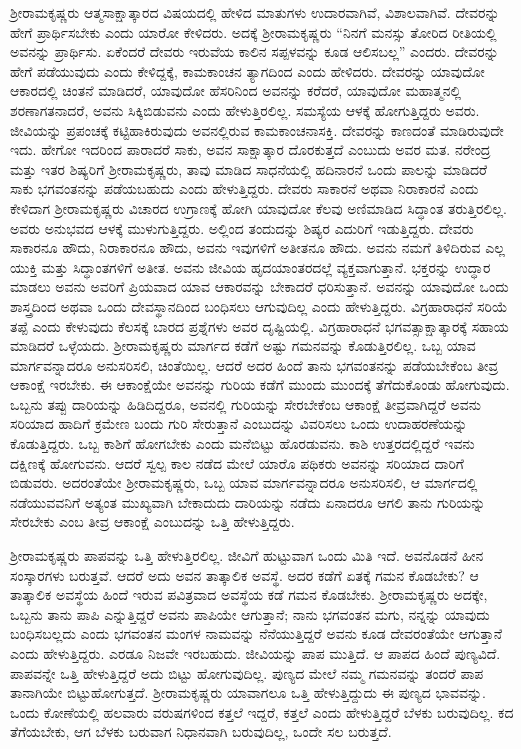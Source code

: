 ಶ‍್ರೀರಾಮಕೃಷ್ಣರು ಆತ್ಮಸಾಕ್ಷಾತ್ಕಾರದ ವಿಷಯದಲ್ಲಿ ಹೇಳಿದ ಮಾತುಗಳು ಉದಾರವಾಗಿವೆ, ವಿಶಾಲವಾಗಿವೆ. ದೇವರನ್ನು ಹೇಗೆ ಪ್ರಾರ್ಥಿಸಬೇಕು ಎಂದು ಯಾರೋ ಕೇಳಿದರು. ಅದಕ್ಕೆ ಶ‍್ರೀರಾಮಕೃಷ್ಣರು “ನಿನಗೆ ಮನಸ್ಸು ತೋರಿದ ರೀತಿಯಲ್ಲಿ ಅವನನ್ನು ಪ್ರಾರ್ಥಿಸು. ಏಕೆಂದರೆ ದೇವರು ಇರುವೆಯ ಕಾಲಿನ ಸಪ್ಪಳವನ್ನು ಕೂಡ ಆಲಿಸಬಲ್ಲ” ಎಂದರು. ದೇವರನ್ನು ಹೇಗೆ ಪಡೆಯುವುದು ಎಂದು ಕೇಳಿದ್ದಕ್ಕೆ, ಕಾಮಕಾಂಚನ ತ್ಯಾಗದಿಂದ ಎಂದು ಹೇಳಿದರು. ದೇವರನ್ನು ಯಾವುದೋ ಆಕಾರದಲ್ಲಿ ಚಿಂತನೆ ಮಾಡಿದರೆ, ಯಾವುದೋ ಹೆಸರಿನಿಂದ ಅವನನ್ನು ಕರೆದರೆ, ಯಾವುದೋ ಮಹಾತ್ಮನಲ್ಲಿ ಶರಣಾಗತನಾದರೆ, ಅವನು ಸಿಕ್ಕಿಬಿಡುವನು ಎಂದು ಹೇಳುತ್ತಿರಲಿಲ್ಲ. ಸಮಸ್ಯೆಯ ಆಳಕ್ಕೆ ಹೋಗುತ್ತಿದ್ದರು ಅವರು. ಜೀವಿಯನ್ನು ಪ್ರಪಂಚಕ್ಕೆ ಕಟ್ಟಿಹಾಕಿರುವುದು ಅವನಲ್ಲಿರುವ ಕಾಮಕಾಂಚನಾಸಕ್ತಿ. ದೇವರನ್ನು ಕಾಣದಂತೆ ಮಾಡಿರುವುದೇ ಇದು. ಹೇಗೋ ಇದರಿಂದ ಪಾರಾದರೆ ಸಾಕು, ಅವನ ಸಾಕ್ಷಾತ್ಕಾರ ದೊರಕುತ್ತದೆ ಎಂಬುದು ಅವರ ಮತ. ನರೇಂದ್ರ ಮತ್ತು ಇತರ ಶಿಷ್ಯರಿಗೆ ಶ‍್ರೀರಾಮಕೃಷ್ಣರು, ತಾವು ಮಾಡಿದ ಸಾಧನೆಯಲ್ಲಿ ಹದಿನಾರನೆ ಒಂದು ಪಾಲನ್ನು ಮಾಡಿದರೆ ಸಾಕು ಭಗವಂತನನ್ನು ಪಡೆಯಬಹುದು ಎಂದು ಹೇಳುತ್ತಿದ್ದರು. ದೇವರು ಸಾಕಾರನೆ ಅಥವಾ ನಿರಾಕಾರನೆ ಎಂದು ಕೇಳಿದಾಗ ಶ‍್ರೀರಾಮಕೃಷ್ಣರು ವಿಚಾರದ ಉಗ್ರಾಣಕ್ಕೆ ಹೋಗಿ ಯಾವುದೋ ಕೆಲವು ಅಣಿಮಾಡಿದ ಸಿದ್ಧಾಂತ ತರುತ್ತಿರಲಿಲ್ಲ. ಅವರು ಅನುಭವದ ಆಳಕ್ಕೆ ಮುಳುಗುತ್ತಿದ್ದರು. ಅಲ್ಲಿಂದ ತಂದುದನ್ನು ಶಿಷ್ಯರ ಎದುರಿಗೆ ಇಡುತ್ತಿದ್ದರು. ದೇವರು ಸಾಕಾರನೂ ಹೌದು, ನಿರಾಕಾರನೂ ಹೌದು, ಅವನು ಇವುಗಳಿಗೆ ಅತೀತನೂ ಹೌದು. ಅವನು ನಮಗೆ ತಿಳಿದಿರುವ ಎಲ್ಲ ಯುಕ್ತಿ ಮತ್ತು ಸಿದ್ಧಾಂತಗಳಿಗೆ ಅತೀತ. ಅವನು ಜೀವಿಯ ಹೃದಯಾಂತರದಲ್ಲೆ ವ್ಯಕ್ತವಾಗುತ್ತಾನೆ. ಭಕ್ತರನ್ನು ಉದ್ಧಾರ ಮಾಡಲು ಅವನು ಅವರಿಗೆ ಪ್ರಿಯವಾದ ಯಾವ ಆಕಾರವನ್ನು ಬೇಕಾದರೆ ಧರಿಸುತ್ತಾನೆ. ಅವನನ್ನು ಯಾವುದೋ ಒಂದು ಶಾಸ್ತ್ರದಿಂದ ಅಥವಾ ಒಂದು ದೇವಸ್ಥಾನದಿಂದ ಬಂಧಿಸಲು ಆಗುವುದಿಲ್ಲ ಎಂದು ಹೇಳುತ್ತಿದ್ದರು. ವಿಗ್ರಹಾರಾಧನೆ ಸರಿಯೆ ತಪ್ಪೆ ಎಂದು ಕೇಳುವುದು ಕೆಲಸಕ್ಕೆ ಬಾರದ ಪ್ರಶ್ನೆಗಳು ಅವರ ದೃಷ್ಟಿಯಲ್ಲಿ. ವಿಗ್ರಹಾರಾಧನೆ ಭಗವತ್ಸಾಕ್ಷಾತ್ಕಾರಕ್ಕೆ ಸಹಾಯ ಮಾಡಿದರೆ ಒಳ್ಳೆಯದು. ಶ‍್ರೀರಾಮಕೃಷ್ಣರು ಮಾರ್ಗದ ಕಡೆಗೆ ಅಷ್ಟು ಗಮನವನ್ನು ಕೊಡುತ್ತಿರಲಿಲ್ಲ. ಒಬ್ಬ ಯಾವ ಮಾರ್ಗವನ್ನಾದರೂ ಅನುಸರಿಸಲಿ, ಚಿಂತೆಯಿಲ್ಲ. ಆದರೆ ಅದರ ಹಿಂದೆ ತಾನು ಭಗವಂತನನ್ನು ಪಡೆಯಬೇಕೆಂಬ ತೀವ್ರ ಆಕಾಂಕ್ಷೆ ಇರಬೇಕು. ಈ ಆಕಾಂಕ್ಷೆಯೇ ಅವನನ್ನು ಗುರಿಯ ಕಡೆಗೆ ಮುಂದು ಮುಂದಕ್ಕೆ ತೆಗೆದುಕೊಂಡು ಹೋಗುವುದು. ಒಬ್ಬನು ತಪ್ಪು ದಾರಿಯನ್ನು ಹಿಡಿದಿದ್ದರೂ, ಅವನಲ್ಲಿ ಗುರಿಯನ್ನು ಸೇರಬೇಕೆಂಬ ಆಕಾಂಕ್ಷೆ ತೀವ್ರವಾಗಿದ್ದರೆ ಅವನು ಸರಿಯಾದ ಹಾದಿಗೆ ಕ್ರಮೇಣ ಬಂದು ಗುರಿ ಸೇರುತ್ತಾನೆ ಎಂಬುದನ್ನು ವಿವರಿಸಲು ಒಂದು ಉದಾಹರಣೆಯನ್ನು ಕೊಡುತ್ತಿದ್ದರು. ಒಬ್ಬ ಕಾಶಿಗೆ ಹೋಗಬೇಕು ಎಂದು ಮನೆಬಿಟ್ಟು ಹೊರಡುವನು. ಕಾಶಿ ಉತ್ತರದಲ್ಲಿದ್ದರೆ ಇವನು ದಕ್ಷಿಣಕ್ಕೆ ಹೋಗುವನು. ಆದರೆ ಸ್ವಲ್ಪ ಕಾಲ ನಡೆದ ಮೇಲೆ ಯಾರೊ ಪಥಿಕರು ಅವನನ್ನು ಸರಿಯಾದ ದಾರಿಗೆ ಬಿಡುವರು. ಅದರಂತೆಯೇ ಶ‍್ರೀರಾಮಕೃಷ್ಣರು, ಒಬ್ಬ ಯಾವ ಮಾರ್ಗವನ್ನಾದರೂ ಅನುಸರಿಸಲಿ, ಆ ಮಾರ್ಗದಲ್ಲಿ ನಡೆಯುವವನಿಗೆ ಅತ್ಯಂತ ಮುಖ್ಯವಾಗಿ ಬೇಕಾದುದು ದಾರಿಯನ್ನು ನಡೆದು ಏನಾದರೂ ಆಗಲಿ ತಾನು ಗುರಿಯನ್ನು ಸೇರಬೇಕು ಎಂಬ ತೀವ್ರ ಆಕಾಂಕ್ಷೆ ಎಂಬುದನ್ನು ಒತ್ತಿ ಹೇಳುತ್ತಿದ್ದರು.

ಶ‍್ರೀರಾಮಕೃಷ್ಣರು ಪಾಪವನ್ನು ಒತ್ತಿ ಹೇಳುತ್ತಿರಲಿಲ್ಲ. ಜೀವಿಗೆ ಹುಟ್ಟುವಾಗ ಒಂದು ಮಿತಿ ಇದೆ. ಅವನೊಡನೆ ಹೀನ ಸಂಸ್ಕಾರಗಳು ಬರುತ್ತವೆ. ಆದರೆ ಅದು ಅವನ ತಾತ್ಕಾಲಿಕ ಅವಸ್ಥೆ. ಅದರ ಕಡೆಗೆ ಏತಕ್ಕೆ ಗಮನ ಕೊಡಬೇಕು? ಆ ತಾತ್ಕಾಲಿಕ ಅವಸ್ಥೆಯ ಹಿಂದೆ ಇರುವ ಪವಿತ್ರವಾದ ಅವಸ್ಥೆಯ ಕಡೆ ಗಮನ ಕೊಡಬೇಕು. ಶ‍್ರೀರಾಮಕೃಷ್ಣರು ಅದಕ್ಕೇ, ಒಬ್ಬನು ತಾನು ಪಾಪಿ ಎನ್ನುತ್ತಿದ್ದರೆ ಅವನು ಪಾಪಿಯೇ ಆಗುತ್ತಾನೆ; ನಾನು ಭಗವಂತನ ಮಗು, ನನ್ನನ್ನು ಯಾವುದು ಬಂಧಿಸಬಲ್ಲದು ಎಂದು ಭಗವಂತನ ಮಂಗಳ ನಾಮವನ್ನು ನೆನೆಯುತ್ತಿದ್ದರೆ ಅವನು ಕೂಡ ದೇವರಂತೆಯೇ ಆಗುತ್ತಾನೆ ಎಂದು ಹೇಳುತ್ತಿದ್ದರು. ಎರಡೂ ನಿಜವೇ ಇರಬಹುದು. ಜೀವಿಯನ್ನು ಪಾಪ ಮುತ್ತಿದೆ. ಆ ಪಾಪದ ಹಿಂದೆ ಪುಣ್ಯವಿದೆ. ಪಾಪವನ್ನೇ ಒತ್ತಿ ಹೇಳುತ್ತಿದ್ದರೆ ಅದು ಬಿಟ್ಟು ಹೋಗುವುದಿಲ್ಲ. ಪುಣ್ಯದ ಮೇಲೆ ನಮ್ಮ ಗಮನವನ್ನು ತಂದರೆ ಪಾಪ ತಾನಾಗಿಯೇ ಬಿಟ್ಟುಹೋಗುತ್ತದೆ. ಶ‍್ರೀರಾಮಕೃಷ್ಣರು ಯಾವಾಗಲೂ ಒತ್ತಿ ಹೇಳುತ್ತಿದ್ದುದು ಈ ಪುಣ್ಯದ ಭಾವವನ್ನು. ಒಂದು ಕೋಣೆಯಲ್ಲಿ ಹಲವಾರು ವರುಷಗಳಿಂದ ಕತ್ತಲೆ ಇದ್ದರೆ, ಕತ್ತಲೆ ಎಂದು ಹೇಳುತ್ತಿದ್ದರೆ ಬೆಳಕು ಬರುವುದಿಲ್ಲ. ಕದ ತೆಗೆಯಬೇಕು, ಆಗ ಬೆಳಕು ಬರುವಾಗ ನಿಧಾನವಾಗಿ ಬರುವುದಿಲ್ಲ, ಒಂದೇ ಸಲ ಬರುತ್ತದೆ.

